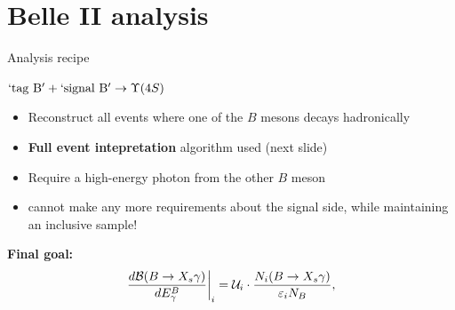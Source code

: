 \documentclass[xcolor=dvipsnames]{beamer}
\begin{document}
   \section{Belle II analysis}

   \begin{frame}{Analysis recipe}
      \scriptsize
      
      $\mathrm{`tag~B'} + \mathrm{`signal~B'} \ra \FourS$
     
      \begin{itemize}
         \item Reconstruct all events where one of the $B$ mesons decays hadronically
         \item[\to] \textbf{Full event intepretation} algorithm used (next slide)
         \item Require a high-energy photon from the other $B$ meson
         \item[\to] cannot make any more requirements about the signal side, while maintaining an inclusive sample!
      \end{itemize}
\textbf{Final goal:}
      \begin{equation}\nonumber
         \left.\frac{d\mathcal{B}(\BtoXsgamma)}{d\EB}\right|_i = \mathcal{U}_i \cdot \frac{N_i(\BtoXsgamma)}{\varepsilon_i N_{B}},
      \end{equation}
   \end{frame}
\end{document}
